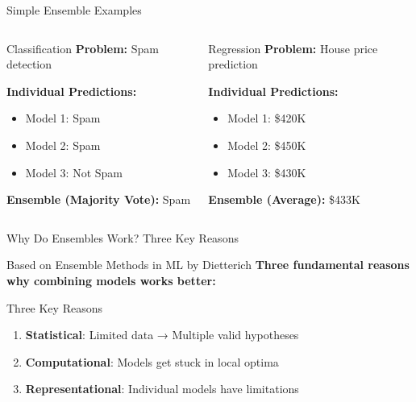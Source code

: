 \documentclass[10pt]{beamer}
\begin{document}
\begin{frame}{Simple Ensemble Examples}
\begin{columns}
\begin{column}{0.5\textwidth}
\begin{examplebox}{Classification}
\textbf{Problem:} Spam detection

\textbf{Individual Predictions:}
\begin{itemize}
\item Model 1: Spam 
\item Model 2: Spam 
\item Model 3: Not Spam 
\end{itemize}

\textbf{Ensemble (Majority Vote):} Spam 
\end{examplebox}
\end{column}

\begin{column}{0.5\textwidth}
\begin{examplebox}{Regression}
\textbf{Problem:} House price prediction

\textbf{Individual Predictions:}
\begin{itemize}
\item Model 1: \$420K
\item Model 2: \$450K
\item Model 3: \$430K
\end{itemize}

\textbf{Ensemble (Average):} \$433K
\end{examplebox}
\end{column}
\end{columns}
\end{frame}


\begin{frame}{Why Do Ensembles Work? Three Key Reasons}
\begin{alertbox}{Based on Ensemble Methods in ML by Dietterich}
\textbf{Three fundamental reasons why combining models works better:}
\end{alertbox}

\begin{keypointsbox}{Three Key Reasons}
\begin{enumerate}
\item \textbf{Statistical}: Limited data → Multiple valid hypotheses
\item \textbf{Computational}: Models get stuck in local optima
\item \textbf{Representational}: Individual models have limitations
\end{enumerate}
\end{keypointsbox}
\end{frame}
\end{document}
